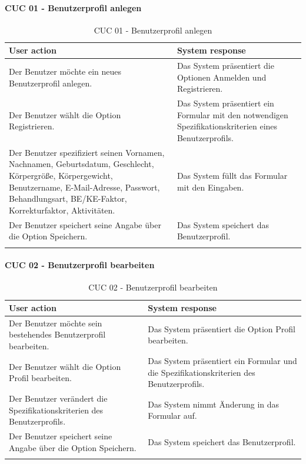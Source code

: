  \paragraph{CUC 01 - Benutzerprofil anlegen}
  \begin{center}
 	\begin{longtable}[H]{|p{6cm}|p{6cm}|}
 		\hline
 		\textbf{User action} & \textbf{System response}\\
 		\hline
 		Der Benutzer möchte ein neues Benutzerprofil anlegen.& Das System präsentiert die Optionen \glqq Anmelden\grqq{} und \glqq Registrieren\grqq{}.\\
 		\hline
 		Der Benutzer wählt die Option \glqq Registrieren\grqq{}. & Das System präsentiert ein Formular mit den notwendigen Spezifikationskriterien eines Benutzerprofils.\\
 		\hline
 		Der Benutzer spezifiziert seinen Vornamen, Nachnamen, Geburtsdatum, Geschlecht, Körpergröße, Körpergewicht, Benutzername, 
 		E-Mail-Adresse, Passwort, Behandlungsart, BE/KE-Faktor, Korrekturfaktor, Aktivitäten. & Das System 	füllt das Formular mit den Eingaben.\\
 		\hline
 		Der Benutzer speichert seine Angabe über die Option \glqq Speichern\grqq{}. & Das System speichert das Benutzerprofil.\\
 		\hline
 		\captionsetup{justification=centering}
 		\caption{CUC 01 - Benutzerprofil anlegen}
 		\label{tab:Persona Use Cases 1}
 	\end{longtable}
 \end{center}
\paragraph{CUC 02 - Benutzerprofil bearbeiten}
\begin{center}
	\begin{longtable}[H]{|p{6cm}|p{6cm}|}
		\hline
		\textbf{User action} & \textbf{System response}\\
		\hline
		Der Benutzer möchte sein bestehendes Benutzerprofil bearbeiten. & Das System präsentiert die Option \glqq Profil bearbeiten\grqq{}.\\
		\hline
		Der Benutzer wählt die Option \glqq Profil bearbeiten\grqq{}. & Das System präsentiert ein Formular und die Spezifikationskriterien des Benutzerprofils.\\
		\hline
		Der Benutzer verändert die Spezifikationskriterien des Benutzerprofils. & Das System nimmt Änderung in das Formular auf.\\
		\hline
		Der Benutzer speichert seine Angabe über die Option \glqq Speichern\grqq{}. & Das System speichert das Benutzerprofil.\\
		\hline
		\captionsetup{justification=centering}
		\caption{CUC 02 - Benutzerprofil bearbeiten}
		\label{tab:Persona Use Cases 2}
	\end{longtable}
\end{center}
